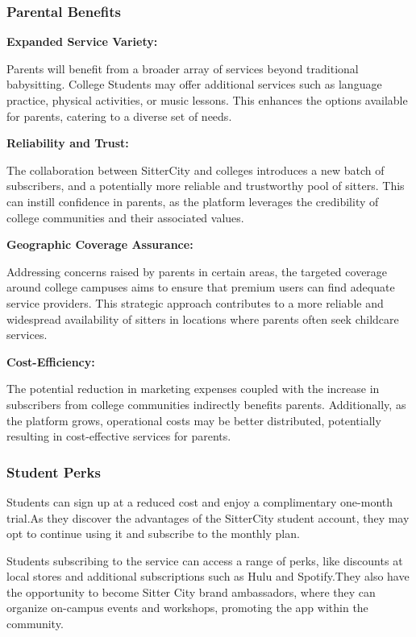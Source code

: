 \documentclass[12pt]{article}
\begin{document}
\hypertarget{parental-benefits}{%
\subsubsection{\texorpdfstring{\textbf{Parental
Benefits}}{Parental Benefits}}\label{parental-benefits}}

\textbf{Expanded Service Variety:}

Parents will benefit from a broader array of services beyond traditional
babysitting. College Students may offer additional services such as
language practice, physical activities, or music lessons. This enhances
the options available for parents, catering to a diverse set of needs.

\textbf{Reliability and Trust:}

The collaboration between SitterCity and colleges introduces a new batch
of subscribers, and a potentially more reliable and trustworthy pool of
sitters. This can instill confidence in parents, as the platform
leverages the credibility of college communities and their associated
values.

\textbf{Geographic Coverage Assurance:}

Addressing concerns raised by parents in certain areas, the targeted
coverage around college campuses aims to ensure that premium users can
find adequate service providers. This strategic approach contributes to
a more reliable and widespread availability of sitters in locations
where parents often seek childcare services.

\textbf{Cost-Efficiency:}

The potential reduction in marketing expenses coupled with the increase
in subscribers from college communities indirectly benefits parents.
Additionally, as the platform grows, operational costs may be better
distributed, potentially resulting in cost-effective services for
parents.

\hypertarget{student-perks}{%
\subsubsection{\texorpdfstring{\textbf{Student
Perks}}{Student Perks}}\label{student-perks}}

Students can sign up at a reduced cost and enjoy a complimentary
one-month trial.As they discover the advantages of the SitterCity
student account, they may opt to continue using it and subscribe to the
monthly plan.~

Students subscribing to the service can access a range of perks, like
discounts at local stores and additional subscriptions such as Hulu and
Spotify.They also have the opportunity to become Sitter City brand
ambassadors, where they can organize on-campus events and workshops,
promoting the app within the community.~
\end{document}
